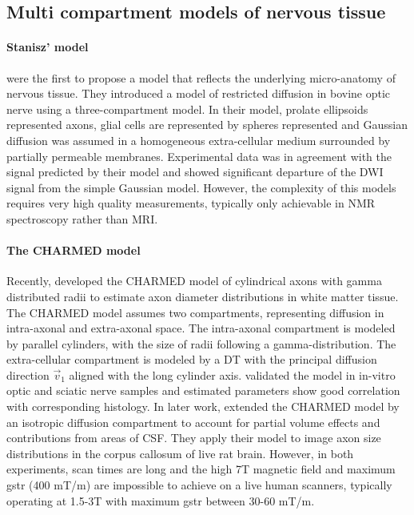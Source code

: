 \subsection*{Multi compartment models of nervous tissue}
\paragraph*{Stanisz' model}
\cite{Stanisz:1997} were the first to propose a model that reflects the underlying micro-anatomy of nervous tissue. They introduced a model of restricted diffusion in bovine optic nerve using a three-compartment model. In their model, prolate ellipsoids represented axons, glial cells are represented by spheres represented and Gaussian diffusion was assumed in a homogeneous extra-cellular medium surrounded by partially permeable membranes. Experimental data was in agreement with the signal predicted by their model and showed significant departure of the {\gls{DWI}} signal from the simple Gaussian model. However, the complexity of this models requires very high quality measurements, typically only achievable in NMR spectroscopy rather than MRI.
\paragraph*{The CHARMED model} 
Recently, \citet{Assaf:2005} developed the CHARMED model of cylindrical axons with gamma distributed radii to estimate axon diameter distributions in white matter tissue. The CHARMED model assumes two compartments, representing diffusion in intra-axonal and extra-axonal space. The intra-axonal compartment is modeled by parallel cylinders, with the size of radii following a gamma-distribution. The extra-cellular compartment is modeled by a {\gls{DT}} with the principal diffusion direction $\vec{v}_1$ aligned with the long cylinder axis. \citet{Alexander:2008} validated the model in in-vitro optic and sciatic nerve samples and estimated parameters show good correlation with corresponding histology. In later work, \citet{Barazany:2009} extended the CHARMED model by an isotropic diffusion compartment to account for partial volume effects and contributions from areas of {\gls{CSF}}. They apply their model to image axon size distributions in the corpus callosum of live rat brain. However, in both experiments, scan times are long and the high 7T magnetic field and maximum {\gls{gstr}} (400 mT/m) are impossible to achieve on a live human scanners, typically operating at 1.5-3T with maximum {\gls{gstr}} between 30-60 mT/m.

